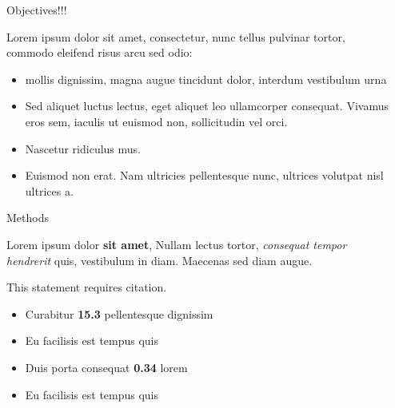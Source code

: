 \documentclass[final]{beamer}
\newlength{\sepwid}
\newlength{\onecolwid}
\begin{document}
\begin{frame}[t]
\begin{columns}[t]
\begin{column}{\onecolwid}
\begin{block}{Objectives!!!}

    Lorem  ipsum dolor sit amet, consectetur, nunc tellus pulvinar tortor, commodo eleifend risus arcu sed odio:
    \begin{itemize}
    \item mollis dignissim, magna augue tincidunt dolor, interdum vestibulum urna
    \item Sed aliquet luctus lectus, eget aliquet leo ullamcorper consequat. Vivamus eros sem, iaculis ut euismod non, sollicitudin vel orci.
    \item Nascetur ridiculus mus.  
    \item Euismod non erat. Nam ultricies pellentesque nunc, ultrices volutpat nisl ultrices a.
    \end{itemize}
    
    \end{block}


\begin{block}{Methods}

    Lorem ipsum dolor \textbf{sit amet}, Nullam lectus tortor, \textit{consequat tempor hendrerit} quis, vestibulum in diam. Maecenas sed diam augue.
    
    This statement requires citation.
    
    \end{block}
    
    
    \begin{itemize}
        \item Curabitur \textbf{15.3} pellentesque dignissim
        \item Eu facilisis est tempus quis
        \item Duis porta consequat \textbf{0.34} lorem
        \item Eu facilisis est tempus quis
        \end{itemize}


\end{column} %

\begin{column}{\sepwid}\end{column} %


\end{columns}
\end{frame}
\end{document}
